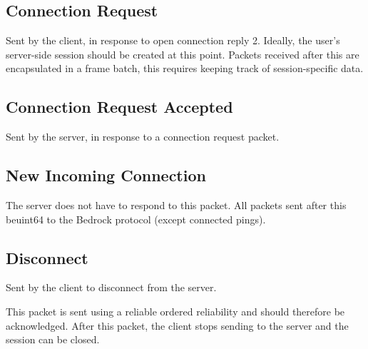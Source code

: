 \subsection{Connection Request}

Sent by the client, in response to open connection reply 2.
Ideally, the user's server-side session should be created at this point.
Packets received after this are encapsulated in a frame batch, this requires keeping track of session-specific data.


\subsection{Connection Request Accepted}

Sent by the server, in response to a connection request packet.


\subsection{New Incoming Connection}

The server does not have to respond to this packet.
All packets sent after this beuint64 to the Bedrock protocol
(except connected pings).


\subsection{Disconnect}

Sent by the client to disconnect from the server.


This packet is sent using a reliable ordered reliability
and should therefore be acknowledged. 
After this packet, the client stops sending to the server and the session can be closed.


